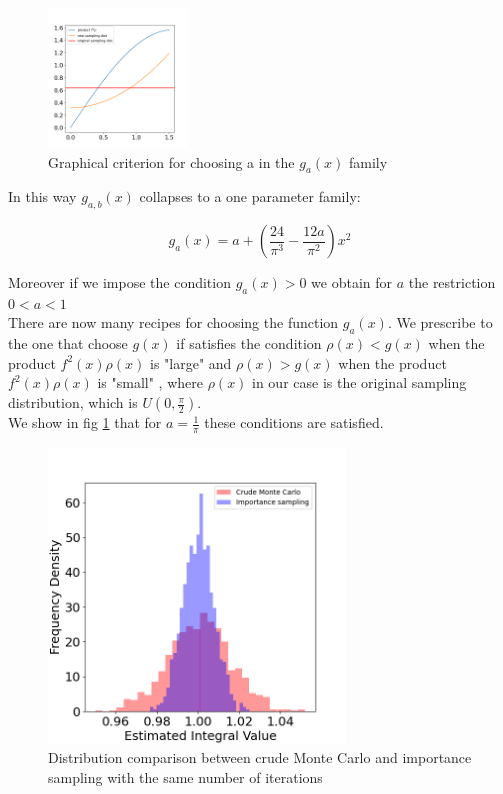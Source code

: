 \begin{figure}
    \vspace{-25pt}
    \centering
    \includegraphics[width=0.33\textwidth]{FIG/exercise_3_images/choice_sampling_function.png}
  \caption{Graphical criterion for choosing a in the $g_a(x)$ family}
  \label{choice_g}
  \end{figure}

In this way $g_{a,b}(x)$ collapses to a one parameter family:

$$ g_{a}(x) = a+ \left( \frac{24}{\pi^3} - \frac{12 a}{\pi^2} \right) x^2 $$

Moreover if we impose the condition $g_{a}(x) > 0$ we obtain for $a$ the restriction $ 0 < a < 1 $ \\

There are now many recipes for choosing the function $g_a(x)$. We prescribe to the one that choose $g(x)$ if satisfies the condition 
$\rho(x)<g(x)$ when the product $f^2(x)\rho(x)$ is "large" and $\rho(x)>g(x)$ when the product $f^2(x)\rho(x)$ is "small" , 
where $\rho(x)$ in our case is the original sampling distribution, which is $U(0, \frac{\pi}{2})$. \\
We show in fig \ref{choice_g} that for $a = \frac{1}{\pi}$ these conditions are satisfied. \\

\begin{figure}[t!]
    \centering
    \includegraphics[width=0.7\textwidth]{FIG/exercise_3_images/distribution_comparison.png}
    \caption{Distribution comparison between crude Monte Carlo and importance sampling with the same number of iterations}
    \label{distribution_comparison}
    \end{figure}

